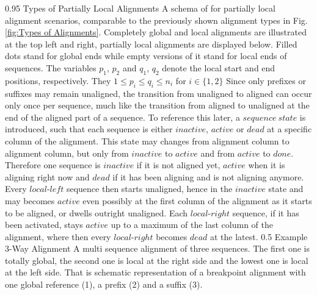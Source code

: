 \documentclass[a4paper,10pt]{thesis}
\newcommand{\lL}{$local\texttt{-}left$}
\newcommand{\lR}{$local\texttt{-}right$}
\begin{document}
{{{{        
        {0.95\textwidth}
        {Types of Partially Local Alignments}
        {A schema of for partially local alignment scenarios, comparable to the previously shown alignment types in Fig. \ref{fig:Types of Alignments}. Completely global and local alignments are illustrated at the top left and right, partially local alignments are displayed below. Filled dots stand for global ends while empty versions of it stand for local ends of sequences. The variables $p_1$, $p_2$ and $q_1$, $q_2$ denote the local start and end positions, respectively. They $1 \leq p_i \leq q_i \leq n_i$ for $i \in \{1,2\}$}%
        Since only prefixes or suffixes may remain unaligned, the transition from unaligned to aligned can occur only once per sequence, much like the transition from aligned to unaligned at the end of the aligned part of a sequence. To reference this later, a $sequence~state$ is introduced, such that each sequence is either $inactive$, $active$ or $dead$ at a specific column of the alignment. This state may changes from alignment column to alignment column, but only from $inactive$ to $active$ and from $active$ to $done$. Therefore one sequence is $inactive$ if it is not aligned yet, $active$ when it is aligning right now and $dead$ if it has been aligning and is not aligning anymore. Every \lL{} sequence then starts unaligned, hence in the $inactive$ state and may becomes $active$ even possibly at the first column of the alignment as it starts to be aligned, or dwells outright unaligned. Each \lR{} sequence, if it has been activated, stays $active$ up to a maximum of the last column of the alignment, where then every \lR{} becomes $dead$ at the latest. 
        {0.5\textwidth}
        {Example 3-Way Alignment}
        {A multi sequence alignment of three sequences. The first one is totally global, the second one is local at the right side and the lowest one is local at the left side. That is schematic representation of a breakpoint alignment with one global reference (1), a prefix (2) and a suffix (3).}%
}}}}
\end{document}
